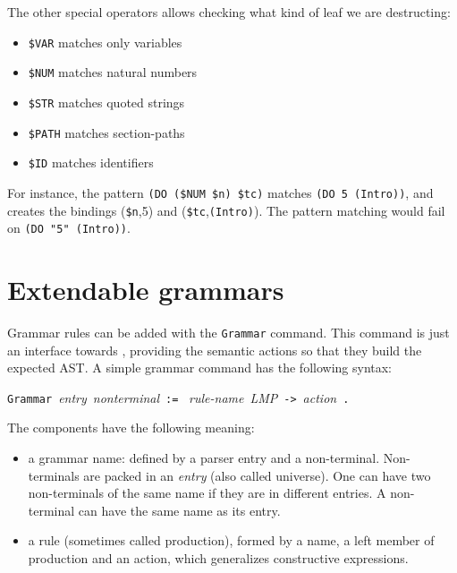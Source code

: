{The other special operators allows checking what kind of leaf we
are destructing:
\begin{itemize}
\item{\tt\$VAR} matches only variables
\item{\tt\$NUM} matches natural numbers
\item{\tt\$STR} matches quoted strings
\item{\tt\$PATH} matches section-paths
\item{\tt\$ID} matches identifiers
\end{itemize}
\noindent For instance, the pattern \verb+(DO ($NUM $n) $tc)+ matches
\verb+(DO 5 (Intro))+, and creates the bindings ({\tt\$n},5) and
({\tt\$tc},\verb+(Intro)+). The pattern matching would fail on
\verb+(DO "5" (Intro))+.

\section{Extendable grammars}
\label{Grammar}

Grammar rules can be added with the {\tt Grammar} command. This
command is just an interface towards {\camlpppp}, providing the
semantic actions so that they build the expected AST. A simple grammar
command has the following syntax: 

\begin{center}
\texttt{Grammar}~\textsl{entry}~\textsl{nonterminal}~\texttt{:=}~%
\textsl{rule-name}~\textsl{LMP}~\verb+->+~\textsl{action}~\texttt{.}
\end{center}

The components have the following meaning:
\begin{itemize}
\item a grammar name: defined by a parser entry and a non-terminal.
  Non-terminals are packed in an \emph{entry} (also called
  universe). One can have two non-terminals of the same name if they
  are in different entries. A non-terminal can have the same name as
  its entry.
\item a rule (sometimes called production), formed by a name, a left
  member of production and an action, which generalizes constructive
  expressions.
\end{itemize}

}
